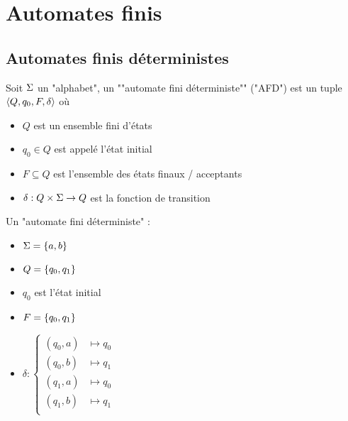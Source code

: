 
\section{Automates finis}

\subsection{Automates finis déterministes}

\begin{definition}
	\AP
	Soit $\Sigma$ un "alphabet", un ""automate fini déterministe"" ("AFD") est un tuple $\langle Q, q_0, F, \delta \rangle$ où
	\begin{itemize}
		\item $Q$ est un ensemble fini d'états
		\item $q_0 \in Q$ est appelé l'état initial
		\item $F \subseteq Q$ est l'ensemble des états finaux / acceptants
		\item $\delta : Q \times \Sigma \to Q$ est la fonction de transition
	\end{itemize}
\end{definition}


\begin{exemple} Un "automate fini déterministe" :
	\vspace{0.5cm}
	\begin{minipage}{0.5\textwidth}
		\begin{itemize}
			\item $\Sigma = \left\{a, b\right\}$
			\item $Q = \left\{q_0, q_1\right\}$
			\item $q_0$ est l'état initial
			\item $F = \left\{q_0, q_1\right\}$
			\item $\delta :
				      \left\{
				      \begin{array}{cc}
					      (q_0, a) & \mapsto q_0 \\
					      (q_0, b) & \mapsto q_1 \\
					      (q_1, a) & \mapsto q_0 \\
					      (q_1, b) & \mapsto q_1 \\
				      \end{array}
				      \right.$
		\end{itemize}
	\end{minipage}
	\begin{minipage}{0.5\textwidth}
		\begin{automata}
		\end{automata}
	\end{minipage}
\end{exemple}

